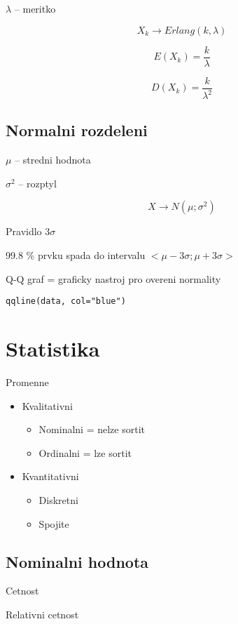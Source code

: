 \documentclass{article}
\begin{document}
$\lambda$ -- meritko

\[ X_k \rightarrow Erlang(k, \lambda) \]

\[ E(X_k) = \frac{k}{\lambda} \]

\[ D(X_k) = \frac{k}{\lambda^2} \]

\subsection{Normalni rozdeleni}

$\mu$ -- stredni hodnota

$\sigma^2$ -- rozptyl

\[ X \rightarrow N(\mu; \sigma^2) \]

Pravidlo 3$\sigma$

99.8 \% prvku spada do intervalu $<\mu - 3\sigma; \mu + 3\sigma>$

Q-Q graf = graficky nastroj pro overeni normality

\begin{verbatim}
qqline(data, col="blue")
\end{verbatim}

\section{Statistika}

Promenne

\begin{itemize}
    \item Kvalitativni
        \begin{itemize}
            \item Nominalni = nelze sortit
            \item Ordinalni = lze sortit
        \end{itemize}
    \item Kvantitativni
        \begin{itemize}
            \item Diskretni
            \item Spojite
        \end{itemize}
\end{itemize}

\subsection{Nominalni hodnota}

Cetnost

Relativni cetnost
\end{document}
